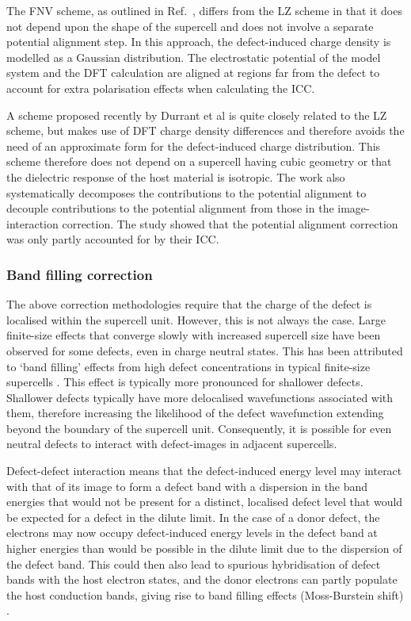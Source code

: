 \documentclass[11pt, twoside]{report}
\begin{document}
The FNV scheme, as outlined in Ref.~, differs from the LZ scheme in that it does not depend upon the shape of the supercell and does not involve a separate potential alignment step. In this approach, the defect-induced charge density is modelled as a Gaussian distribution. The electrostatic potential of the model system and the DFT calculation are aligned at regions far from the defect to account for extra polarisation effects when calculating the ICC.

A scheme proposed recently by Durrant et al \cite{Durrant_defects} is quite closely related to the LZ scheme, but makes use of DFT charge density differences and therefore avoids the need of an approximate form for the defect-induced charge distribution. This scheme therefore does not depend on a supercell having cubic geometry or that the dielectric response of the host material is isotropic. The work also systematically decomposes the contributions to the potential alignment to decouple contributions to the potential alignment from those in the image-interaction correction. The study showed that the potential alignment correction was only partly accounted for by their ICC.


\subsubsection{Band filling correction}

The above correction methodologies require that the charge of the defect is localised within the supercell unit. However, this is not always the case. Large finite-size effects that converge slowly with increased supercell size have been observed for some defects, even in charge neutral states. This has been attributed to ‘band filling’ effects from high defect concentrations in typical finite-size supercells \cite{Lany_defects_2008, CIS_defects, pylada}. This effect is typically more pronounced for shallower defects. Shallower defects typically have more delocalised wavefunctions associated with them, therefore increasing the likelihood of the defect wavefunction extending beyond the boundary of the supercell unit. Consequently, it is possible for even neutral defects to interact with defect-images in adjacent supercells. 

Defect-defect interaction means that the defect-induced energy level may interact with that of its image to form a defect band with a dispersion in the band energies that would not be present for a distinct, localised defect level that would be expected for a defect in the dilute limit. In the case of a donor defect, the electrons may now occupy defect-induced energy levels in the defect band at higher energies than would be possible in the dilute limit due to the dispersion of the defect band. This could then also lead to spurious hybridisation of defect bands with the host electron states, and the donor electrons can partly populate the host conduction bands, giving rise to band filling effects (Moss-Burstein shift) \cite{Lany_defects_2008}.
\end{document}

